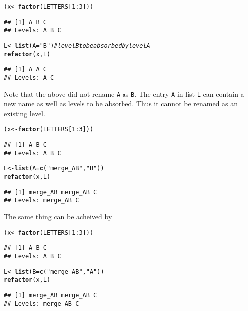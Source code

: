 \documentclass{article}\usepackage[]{graphicx}\usepackage[]{color}
\makeatletter
\newcommand{\hlnum}[1]{\textcolor[rgb]{0.686,0.059,0.569}{#1}}%
\newcommand{\hlstr}[1]{\textcolor[rgb]{0.192,0.494,0.8}{#1}}%
\newcommand{\hlcom}[1]{\textcolor[rgb]{0.678,0.584,0.686}{\textit{#1}}}%
\newcommand{\hlopt}[1]{\textcolor[rgb]{0,0,0}{#1}}%
\newcommand{\hlstd}[1]{\textcolor[rgb]{0.345,0.345,0.345}{#1}}%
\newcommand{\hlkwb}[1]{\textcolor[rgb]{0.69,0.353,0.396}{#1}}%
\newcommand{\hlkwc}[1]{\textcolor[rgb]{0.333,0.667,0.333}{#1}}%
\newcommand{\hlkwd}[1]{\textcolor[rgb]{0.737,0.353,0.396}{\textbf{#1}}}%
\newenvironment{kframe}{%
 \def\at@end@of@kframe{}%
 \ifinner\ifhmode%
  \def\at@end@of@kframe{\end{minipage}}%
  \begin{minipage}{\columnwidth}%
 \fi\fi%
 \def\FrameCommand##1{\hskip\@totalleftmargin \hskip-\fboxsep
 \colorbox{shadecolor}{##1}\hskip-\fboxsep
     \hskip-\linewidth \hskip-\@totalleftmargin \hskip\columnwidth}%
 \MakeFramed {\advance\hsize-\width
   \@totalleftmargin\z@ \linewidth\hsize
   \@setminipage}}%
 {\par\unskip\endMakeFramed%
 \at@end@of@kframe}
\newenvironment{knitrout}{}{} %
\newcommand{\code}{\texttt}
\makeatother
\begin{document}
\begin{knitrout}
\color{fgcolor}\begin{kframe}
\begin{alltt}
\hlstd{(x} \hlkwb{<-} \hlkwd{factor}\hlstd{(LETTERS[}\hlnum{1}\hlopt{:}\hlnum{3}\hlstd{]))}
\end{alltt}
\begin{verbatim}
## [1] A B C
## Levels: A B C
\end{verbatim}
\begin{alltt}
\hlstd{L} \hlkwb{<-} \hlkwd{list}\hlstd{(}\hlkwc{A}\hlstd{=}\hlstr{"B"}\hlstd{)} \hlcom{# level B to be absorbed by level A}
\hlkwd{refactor}\hlstd{(x,L)}
\end{alltt}
\begin{verbatim}
## [1] A A C
## Levels: A C
\end{verbatim}
\end{kframe}
\end{knitrout}
Note that the above did not rename \code{A} as \code{B}. The entry \code{A} in list \code{L} can contain a new name as well as levels to be absorbed. Thus it cannot be renamed as an existing level.
\begin{knitrout}
\color{fgcolor}\begin{kframe}
\begin{alltt}
\hlstd{(x} \hlkwb{<-} \hlkwd{factor}\hlstd{(LETTERS[}\hlnum{1}\hlopt{:}\hlnum{3}\hlstd{]))}
\end{alltt}
\begin{verbatim}
## [1] A B C
## Levels: A B C
\end{verbatim}
\begin{alltt}
\hlstd{L} \hlkwb{<-} \hlkwd{list}\hlstd{(}\hlkwc{A}\hlstd{=}\hlkwd{c}\hlstd{(}\hlstr{"merge_AB"}\hlstd{,} \hlstr{"B"}\hlstd{))}
\hlkwd{refactor}\hlstd{(x,L)}
\end{alltt}
\begin{verbatim}
## [1] merge_AB merge_AB C       
## Levels: merge_AB C
\end{verbatim}
\end{kframe}
\end{knitrout}
The same thing can be acheived by
\begin{knitrout}
\color{fgcolor}\begin{kframe}
\begin{alltt}
\hlstd{(x} \hlkwb{<-} \hlkwd{factor}\hlstd{(LETTERS[}\hlnum{1}\hlopt{:}\hlnum{3}\hlstd{]))}
\end{alltt}
\begin{verbatim}
## [1] A B C
## Levels: A B C
\end{verbatim}
\begin{alltt}
\hlstd{L} \hlkwb{<-} \hlkwd{list}\hlstd{(}\hlkwc{B}\hlstd{=}\hlkwd{c}\hlstd{(}\hlstr{"merge_AB"}\hlstd{,} \hlstr{"A"}\hlstd{))}
\hlkwd{refactor}\hlstd{(x,L)}
\end{alltt}
\begin{verbatim}
## [1] merge_AB merge_AB C       
## Levels: merge_AB C
\end{verbatim}
\end{kframe}
\end{knitrout}
\end{document}
